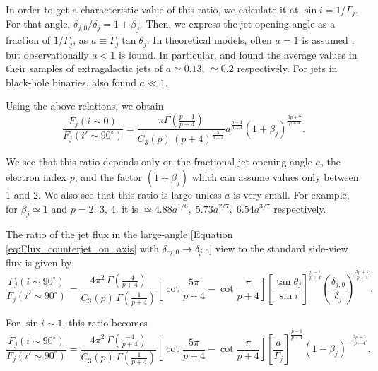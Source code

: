 In order to get a characteristic value of this ratio, we calculate it at $ \sin i = 1 / \Gamma_j $. For that angle, $ \delta_{j,0} / \delta_j = 1 + \beta_j $. Then, we express the jet opening angle as a fraction of $ 1 / \Gamma_j $, as $ a \equiv \Gamma_j \tan \theta_j $. In theoretical models, often $ a = 1 $ is assumed \citep{Zamaninasab_et_al.-2014-Nature}, but observationally $ a < 1 $ is found. In particular, \cite{Pushkarev_et_al.-2009-A&A} and \cite{Clausen-Brown_et_al.-2013-A&A} found the average values in their samples of extragalactic jets of $ a \simeq 0.13 $, $ \simeq 0.2 $ respectively. For jets in black-hole binaries, \cite{Miller-Jones_et_al.-2006-MNRAS} also found $ a \ll 1 $.

Using the above relations, we obtain
\begin{equation}
\frac{F_j (i \sim 0)} {F_j ( i' \sim 90^{\circ} ) } = 
\dfrac{\pi \Gamma \left( \frac{p-1}{p+4} \right)}{C_3(p) \, (p+4)^{\frac{5}{p+4}}} a^{\frac{p-1}{p+4}}  ( 1 + \beta_j)^{\frac{3p+7}{p+4}}.
\end{equation}

We see that this ratio depends only on the fractional jet opening angle $a$, the electron index $p$, and the factor $( 1 + \beta_j )$ which can assume values only between 1 and 2. We also see that this ratio is large unless $a$ is very small. For example, for $\beta_j \simeq 1$ and $p = 2, \, 3, \, 4 $, it is $ \simeq  4.88 a^{1/6}, \; 5.73 a^{2/7} , \; 6.54 a^{3/7} $ respectively.


The ratio of the jet flux in the large-angle [Equation \ref{eq:Flux_counterjet_on_axis} with $ \delta_{cj,0} \rightarrow \delta_{j,0} $] view to the standard side-view flux is given by
\begin{equation}
\frac{F_j (i \sim 90^{\circ})}{F_j (i' \sim 90^{\circ})} = \dfrac{ 4 \pi^2 \, \Gamma \left( \frac{-4}{p+4} \right) }{ C_3(p) \, \Gamma \left( \frac{1}{p+4} \right) } [\cot \frac{5 \pi}{p+4} - \cot \frac{\pi}{p+4} ] \left[ \frac{\tan \theta_j}{\sin i} \right]^{ \frac{p-1}{p+4} } \left( \frac{\delta_{j,0}}{\delta_j} \right)^{ \frac{3p+7}{p+4} }.
\end{equation}

For $ \sin i \sim 1 $, this ratio becomes
\begin{equation}
\frac{F_j (i \sim 90^{\circ})}{F_j (i' \sim 90^{\circ})} = \dfrac{ 4 \pi^2 \, \Gamma \left( \frac{-4}{p+4} \right) }{ C_3(p) \, \Gamma \left( \frac{1}{p+4} \right) } [\cot \frac{5 \pi}{p+4} - \cot \frac{\pi}{p+4} ] \left[ \frac{a}{\Gamma_j} \right]^{ \frac{p-1}{p+4} } \left( {1 - \beta_j} \right)^{-\frac{3p+7}{p+4}}.
\end{equation}


